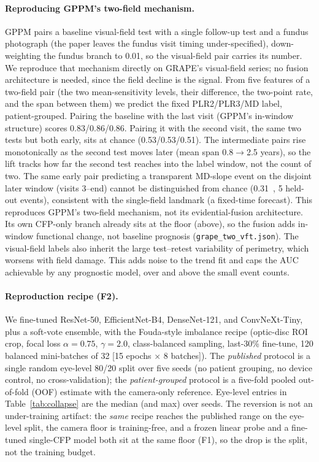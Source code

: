\paragraph{Reproducing GPPM's two-field mechanism.} GPPM pairs a baseline visual-field test with a single follow-up
test and a fundus photograph (the paper leaves the fundus visit timing under-specified), down-weighting the fundus
branch to \num{0.01}, so the visual-field pair carries its number. We reproduce that mechanism directly on GRAPE's visual-field series; no fusion architecture is needed, since
the field decline is the signal. From five features of a two-field pair (the two mean-sensitivity levels, their
difference, the two-point rate, and the span between them) we predict the fixed PLR2/PLR3/MD label, patient-grouped.
Pairing the baseline with the last visit (GPPM's in-window structure) scores \num{0.83}/\num{0.86}/\num{0.86}. Pairing it
with the second visit, the same two tests but both early, sits at chance (\num{0.53}/\num{0.53}/\num{0.51}). The
intermediate pairs rise monotonically as the second test moves later (mean span \num{0.8}$\rightarrow$\num{2.5} years),
so the lift tracks how far the second test reaches into the label window, not the count of two. The same early pair
predicting a transparent MD-slope event on the disjoint later window (visits 3--end) cannot be distinguished from chance
(\num{0.31}~, 5 held-out events), consistent with the single-field landmark (a fixed-time forecast). This reproduces GPPM's
two-field mechanism, not its evidential-fusion architecture. Its own CFP-only branch already sits at the floor
(above), so the fusion adds in-window functional change, not baseline prognosis (\texttt{grape\_two\_vft.json}). The
visual-field labels also inherit the large test--retest variability of perimetry, which worsens with field damage. This
adds noise to the trend fit and caps the AUC achievable by any prognostic model, over and above the small event counts.

\paragraph{Reproduction recipe (F2).} We fine-tuned ResNet-50, EfficientNet-B4, DenseNet-121, and ConvNeXt-Tiny, plus
a soft-vote ensemble, with the Fouda-style imbalance recipe (optic-disc ROI crop, focal loss $\alpha{=}0.75$,
$\gamma{=}2.0$, class-balanced sampling, last-30\% fine-tune, 120 balanced mini-batches of 32 [15 epochs $\times$ 8
batches]). The
\emph{published} protocol is a single random eye-level 80/20 split over five seeds (no patient grouping, no device
control, no cross-validation); the \emph{patient-grouped} protocol is a five-fold pooled out-of-fold (OOF) estimate with the camera-only
reference. Eye-level entries in Table~\ref{tab:collapse} are the median (and max) over seeds. The reversion is not
an under-training artifact: the \emph{same} recipe reaches the published range on the eye-level split, the camera floor
is training-free, and a frozen linear probe and a fine-tuned single-CFP model both sit at the same floor (F1), so the drop is
the split, not the training budget.

